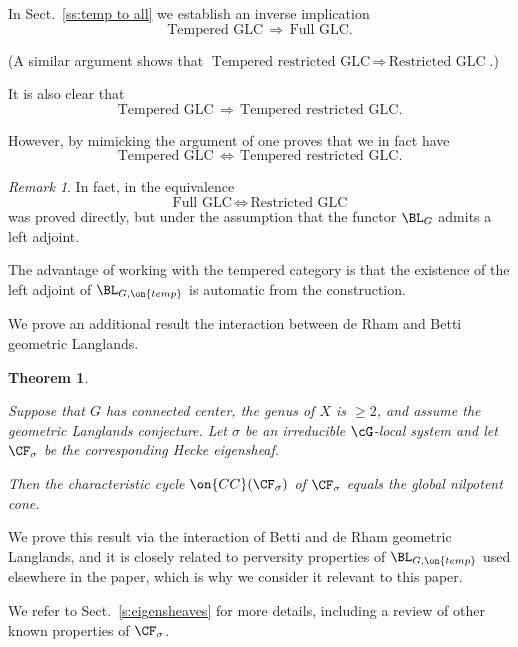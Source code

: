 \documentclass[9pt]{amsart}
\newtheorem{thm}[subsubsection]{Theorem}
\theoremstyle{remark}
\newtheorem{rem}[subsubsection]{Remark}
\theoremstyle{definition}
\theoremstyle{remark}
\newcommand{\secref}[1]{Sect.~\ref{#1}}
\numberwithin{equation}{section}
\begin{document}
In \secref{ss:temp to all} we establish an inverse implication
$$\text{Tempered GLC}  \, \Rightarrow \,  \text{Full GLC}.$$

(A similar argument shows that $\text{Tempered restricted GLC} \, \Rightarrow \, \text{Restricted GLC}$.) 

\sssec{}

It is also clear that
$$\text{Tempered GLC}  \, \Rightarrow \, \text{Tempered restricted GLC}.$$

However, by mimicking the argument of \cite[Sect. 21.4]{AGKRRV} one proves that we in fact have 
$$\text{Tempered GLC}  \, \Leftrightarrow \, \text{Tempered restricted GLC}.$$

\begin{rem}
In fact, in \cite[Sect. 21.4]{AGKRRV} the equivalence 
$$\text{Full GLC}\, \Leftrightarrow\, \text{Restricted GLC}$$
was proved directly, but under the assumption that the functor $\BL_G$ admits a left adjoint. 

\medskip

The advantage of working with the tempered category is that the existence of the left adjoint 
of $\BL_{G,\on{temp}}$ is automatic from the construction.

\end{rem} 


We prove an additional result  the interaction between
de Rham and Betti geometric Langlands.

\begin{thm}\label{t:cc-intro}

Suppose that $G$ has connected center, the genus of $X$ is $\geq 2$, and 
assume the geometric Langlands conjecture. Let $\sigma$ be an irreducible
$\cG$-local system and let $\CF_{\sigma}$ be the corresponding Hecke eigensheaf.

Then the characteristic cycle $\on{CC}(\CF_{\sigma})$ of $\CF_{\sigma}$ equals
the global nilpotent cone.

\end{thm}

We prove this result via the interaction of Betti and de Rham geometric Langlands,
and it is closely related to perversity properties of $\BL_{G,\on{temp}}$
used elsewhere in the paper, 
which is why we consider it relevant to this paper.

\medskip 

We refer to \secref{s:eigensheaves} for more details, including a review
of other known properties of $\CF_{\sigma}$.
\end{document}
